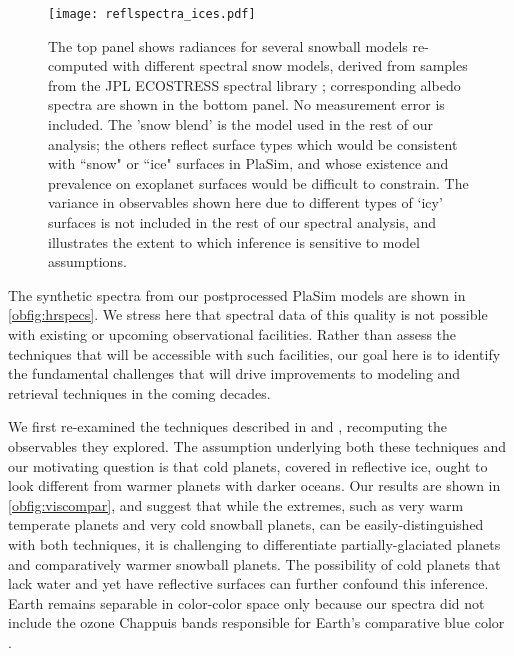 \documentclass[fleqn,usenatbib]{mnras}
\begin{document}
\begin{figure*}
\begin{center}
\texttt{[image: reflspectra\_ices.pdf]}
\end{center}
\caption{The top panel shows radiances for several snowball models re-computed with different spectral snow models, derived from samples from the JPL ECOSTRESS spectral library \citep{aster,ecostress}; corresponding albedo spectra are shown in the bottom panel. No measurement error is included. The 'snow blend' is the model used in the rest of our analysis; the others reflect surface types which would be consistent with ``snow" or ``ice" surfaces in PlaSim, and whose existence and prevalence on exoplanet surfaces would be difficult to constrain. The variance in observables shown here due to different types of `icy' surfaces is not included in the rest of our spectral analysis, and illustrates the extent to which inference is sensitive to model assumptions.}\label{obfig:iceblends}
\end{figure*}

The synthetic spectra from our postprocessed PlaSim models are shown in \autoref{obfig:hrspecs}. We stress here that spectral data of this quality is not possible with existing or upcoming observational facilities. Rather than assess the techniques that will be accessible with such facilities, our goal here is to identify the fundamental challenges that will drive improvements to modeling and retrieval techniques in the coming decades.

We first re-examined the techniques described in \citet{Cowan2011} and \citet{Krissansen-Totton2016}, recomputing the observables they explored. The assumption underlying both these techniques and our motivating question is that cold planets, covered in reflective ice, ought to look different from warmer planets with darker oceans. Our results are shown in \autoref{obfig:viscompar}, and suggest that while the extremes, such as very warm temperate planets and very cold snowball planets, can be easily-distinguished with both techniques, it is challenging to differentiate partially-glaciated planets and comparatively warmer snowball planets. The possibility of cold planets that lack water and yet have reflective surfaces can further confound this inference. Earth remains separable in color-color space only because our spectra did not include the ozone Chappuis bands responsible for Earth's comparative blue color \citep{Krissansen-Totton2016}. 
\end{document}
